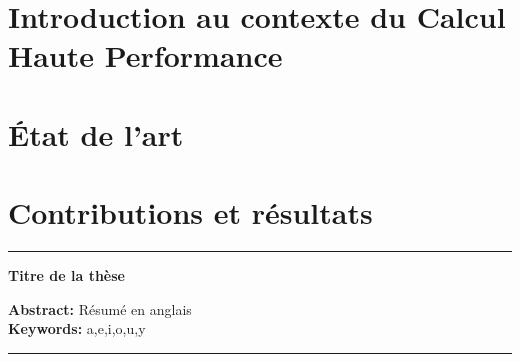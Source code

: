 \documentclass[11pt,twoside, french]{StyleThese}
\begin{document}
\printglossary[type=main]           %
\printglossary[type=\acronymtype]   %




\mainmatter

%


\part{Introduction au contexte du Calcul Haute Performance}


\part{État de l'art}


\part{Contributions et résultats}


\appendix



%
%

\printbibliography[sorting=none, heading=bibliography]

  \printindex


\cleardoublepage

\begin{vcenterpage}
\noindent\rule[2pt]{\textwidth}{0.5pt}
\begin{center}
{\large\textbf{Titre de la thèse\\}}
\end{center}
{\large\textbf{Abstract:}}
Résumé en anglais
\\
{\large\textbf{Keywords:}}
a,e,i,o,u,y
\\
\noindent\rule[2pt]{\textwidth}{0.5pt}
\end{vcenterpage}
\end{document}
